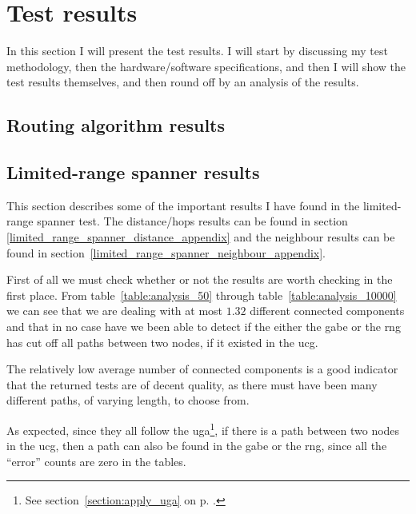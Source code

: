 \section{Test results}
\label{section:test_results}
In this section I will present the test results. I will start by discussing my test methodology, then the hardware/software specifications, and then I will show the test results themselves, and then round off by an analysis of the results.

\subsection{Routing algorithm results}




\subsection{Limited-range spanner results}
\label{section:test_results_spanners}
This section describes some of the important results I have found in the limited-range spanner test. The distance/hops results can be found in section \ref{limited_range_spanner_distance_appendix} and the neighbour results can be found in section~\ref{limited_range_spanner_neighbour_appendix}.

First of all we must check whether or not the results are worth checking in the first place. From table~\ref{table:analysis_50} through table~\ref{table:analysis_10000} we can see that we are dealing with at most $1.32$ different connected components and that in no case have we been able to detect if the either the \ac{gabe} or the \ac{rng} has cut off all paths between two nodes, if it existed in the \ac{ucg}. 

The relatively low average number of connected components is a good indicator that the returned tests are of decent quality, as there must have been many different paths, of varying length, to choose from.

As expected, since they all follow the \ac{uga}\footnote{See section~\ref{section:apply_uga} on p. \pageref{section:apply_uga}.}, if there is a path between two nodes in the \ac{ucg}, then a path can also be found in the \ac{gabe} or the \ac{rng}, since all the ``error'' counts are zero in the tables.


